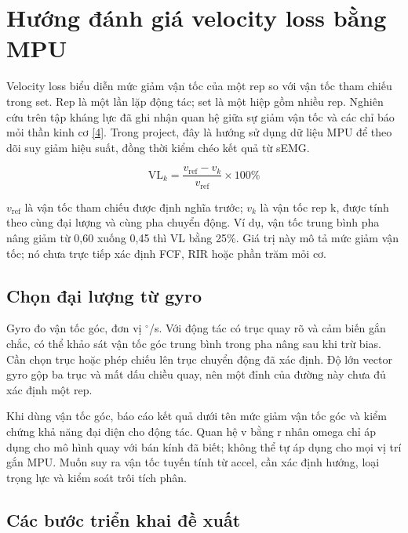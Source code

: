 \documentclass[12pt,letterpaper]{article}
\begin{document}



\clearpage

\section{Hướng đánh giá velocity loss bằng MPU}

Velocity loss biểu diễn mức giảm vận tốc của một rep so với vận tốc tham chiếu trong set. Rep là một lần lặp động tác; set là một hiệp gồm nhiều rep. Nghiên cứu trên tập kháng lực đã ghi nhận quan hệ giữa sự giảm vận tốc và các chỉ báo mỏi thần kinh cơ \hyperlink{ref4}{[4]}. Trong project, đây là hướng sử dụng dữ liệu MPU để theo dõi suy giảm hiệu suất, đồng thời kiểm chéo kết quả từ sEMG.


\[\mathrm{VL}_k=\frac{v_{\mathrm{ref}}-v_k}{v_{\mathrm{ref}}}\times100\%\]

\(v_{\mathrm{ref}}\) là vận tốc tham chiếu được định nghĩa trước; \(v_k\) là vận tốc rep k, được tính theo cùng đại lượng và cùng pha chuyển động. Ví dụ, vận tốc trung bình pha nâng giảm từ 0,60  xuống 0,45  thì VL bằng 25\%. Giá trị này mô tả mức giảm vận tốc; nó chưa trực tiếp xác định FCF, RIR hoặc phần trăm mỏi cơ.


\subsection*{Chọn đại lượng từ gyro}

Gyro đo vận tốc góc, đơn vị \ensuremath{^{\circ}}/s. Với động tác có trục quay rõ và cảm biến gắn chắc, có thể khảo sát vận tốc góc trung bình trong pha nâng sau khi trừ bias. Cần chọn trục hoặc phép chiếu lên trục chuyển động đã xác định. Độ lớn vector gyro gộp ba trục và mất dấu chiều quay, nên một đỉnh của đường này chưa đủ xác định một rep.


Khi dùng vận tốc góc, báo cáo kết quả dưới tên mức giảm vận tốc góc và kiểm chứng khả năng đại diện cho động tác. Quan hệ v bằng r nhân omega chỉ áp dụng cho mô hình quay với bán kính đã biết; không thể tự áp dụng cho mọi vị trí gắn MPU. Muốn suy ra vận tốc tuyến tính từ accel, cần xác định hướng, loại trọng lực và kiểm soát trôi tích phân.


\subsection*{Các bước triển khai đề xuất}
\end{document}

